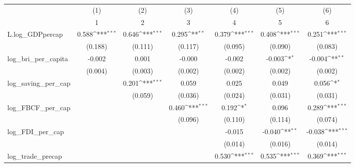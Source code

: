 {
\def\sym#1{\ifmmode^{#1}\else\(^{#1}\)\fi}
\begin{tabular}{l*{6}{c}}
\toprule
            &\multicolumn{1}{c}{(1)}&\multicolumn{1}{c}{(2)}&\multicolumn{1}{c}{(3)}&\multicolumn{1}{c}{(4)}&\multicolumn{1}{c}{(5)}&\multicolumn{1}{c}{(6)}\\
            &\multicolumn{1}{c}{1}&\multicolumn{1}{c}{2}&\multicolumn{1}{c}{3}&\multicolumn{1}{c}{4}&\multicolumn{1}{c}{5}&\multicolumn{1}{c}{6}\\
\midrule
L.log\_GDPpercap&       0.588\sym{***}&       0.646\sym{***}&       0.295\sym{**} &       0.379\sym{***}&       0.408\sym{***}&       0.251\sym{***}\\
            &     (0.188)         &     (0.111)         &     (0.117)         &     (0.095)         &     (0.090)         &     (0.083)         \\
\addlinespace
log\_bri\_per\_capita&      -0.002         &       0.001         &      -0.000         &      -0.002         &      -0.003\sym{*}  &      -0.004\sym{**} \\
            &     (0.004)         &     (0.003)         &     (0.002)         &     (0.002)         &     (0.002)         &     (0.002)         \\
\addlinespace
log\_saving\_per\_cap&                     &       0.201\sym{***}&       0.059         &       0.025         &       0.049         &       0.056\sym{*}  \\
            &                     &     (0.059)         &     (0.036)         &     (0.024)         &     (0.031)         &     (0.031)         \\
\addlinespace
log\_FBCF\_per\_cap&                     &                     &       0.460\sym{***}&       0.192\sym{*}  &       0.096         &       0.289\sym{***}\\
            &                     &                     &     (0.096)         &     (0.110)         &     (0.114)         &     (0.074)         \\
\addlinespace
log\_FDI\_per\_cap&                     &                     &                     &      -0.015         &      -0.040\sym{**} &      -0.038\sym{***}\\
            &                     &                     &                     &     (0.014)         &     (0.016)         &     (0.014)         \\
\addlinespace
log\_trade\_precap&                     &                     &                     &       0.530\sym{***}&       0.535\sym{***}&       0.369\sym{***}\\

\end{tabular}}
